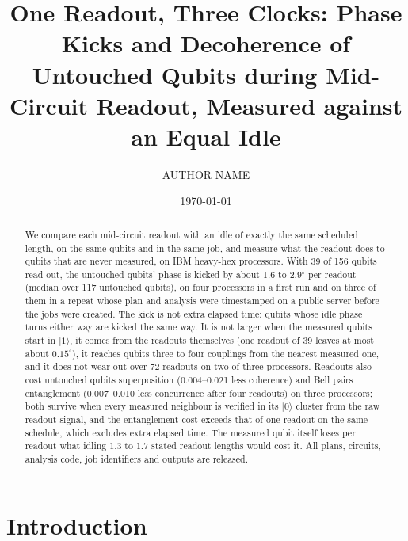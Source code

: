 \documentclass[reprint,amsmath,amssymb,aps,superscriptaddress,nofootinbib]{revtex4-2}
\begin{document}
\title{One Readout, Three Clocks: Phase Kicks and Decoherence of Untouched Qubits during Mid-Circuit Readout, Measured against an Equal Idle}

\author{AUTHOR NAME}

\date{\today}


\begin{abstract}
We compare each mid-circuit readout with an idle of exactly the same scheduled length, on the same qubits and in the same job, and measure what the readout does to qubits that are never measured, on IBM heavy-hex processors. With 39 of 156 qubits read out, the untouched qubits' phase is kicked by about 1.6 to 2.9$^\circ$ per readout (median over 117 untouched qubits), on four processors in a first run and on three of them in a repeat whose plan and analysis were timestamped on a public server before the jobs were created. The kick is not extra elapsed time: qubits whose idle phase turns either way are kicked the same way. It is not larger when the measured qubits start in $|1\rangle$, it comes from the readouts themselves (one readout of 39 leaves at most about $0.15^\circ$), it reaches qubits three to four couplings from the nearest measured one, and it does not wear out over 72 readouts on two of three processors. Readouts also cost untouched qubits superposition (0.004--0.021 less coherence) and Bell pairs entanglement (0.007--0.010 less concurrence after four readouts) on three processors; both survive when every measured neighbour is verified in its $|0\rangle$ cluster from the raw readout signal, and the entanglement cost exceeds that of one readout on the same schedule, which excludes extra elapsed time. The measured qubit itself loses per readout what idling 1.3 to 1.7 stated readout lengths would cost it. All plans, circuits, analysis code, job identifiers and outputs are released.
\end{abstract}

\maketitle

\section{Introduction}
\end{document}

